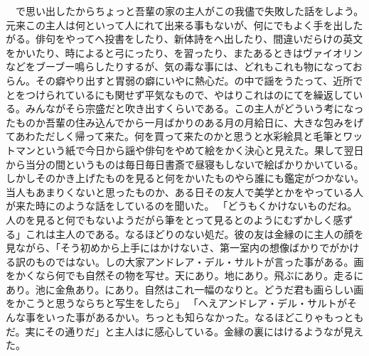 \documentclass[a5j]{ltjtbook}
\begin{document}
　で思い出したからちょっと吾輩の家の主人がこの我儘で失敗した話をしよう。元来この主人は何といって人にれて出来る事もないが、何にでもよく手を出したがる。俳句をやってへ投書をしたり、新体詩をへ出したり、間違いだらけの英文をかいたり、時によると弓にったり、を習ったり、またあるときはヴァイオリンなどをブーブー鳴らしたりするが、気の毒な事には、どれもこれも物になっておらん。その癖やり出すと胃弱の癖にいやに熱心だ。の中で謡をうたって、近所でとをつけられているにも関せず平気なもので、やはりこれはのにてを繰返している。みんながそら宗盛だと吹き出すくらいである。この主人がどういう考になったものか吾輩の住み込んでから一月ばかりのある月の月給日に、大きな包みをげてあわただしく帰って来た。何を買って来たのかと思うと水彩絵具と毛筆とワットマンという紙で今日から謡や俳句をやめて絵をかく決心と見えた。果して翌日から当分の間というものは毎日毎日書斎で昼寝もしないで絵ばかりかいている。しかしそのかき上げたものを見ると何をかいたものやら誰にも鑑定がつかない。当人もあまりくないと思ったものか、ある日その友人で美学とかをやっている人が来た時にのような話をしているのを聞いた。 \newline
「どうもくかけないものだね。人のを見ると何でもないようだがら筆をとって見るとのようにむずかしく感ずる」これは主人のである。なるほどりのない処だ。彼の友は金縁のに主人の顔を見ながら、「そう初めから上手にはかけないさ、第一室内の想像ばかりでがかける訳のものではない。しの大家アンドレア・デル・サルトが言った事がある。画をかくなら何でも自然その物を写せ。天にあり。地にあり。飛ぶにあり。走るにあり。池に金魚あり。にあり。自然はこれ一幅のなりと。どうだ君も画らしい画をかこうと思うならちと写生をしたら」 \newline
「へえアンドレア・デル・サルトがそんな事をいった事があるかい。ちっとも知らなかった。なるほどこりゃもっともだ。実にその通りだ」と主人はに感心している。金縁の裏にはけるようなが見えた。 \newline
\end{document}
